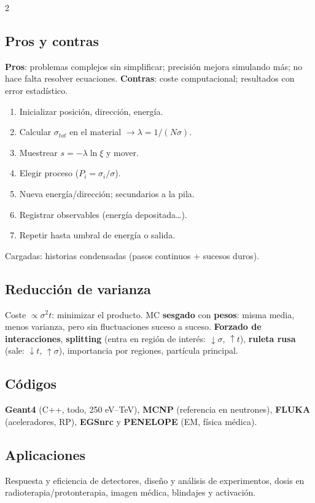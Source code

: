 \documentclass[10pt,a4paper]{article}
\begin{document}
\begin{multicols}{2}
\subsection{Pros y contras}
\textbf{Pros}: problemas complejos sin simplificar; precisión mejora simulando más; no hace falta resolver ecuaciones.
\textbf{Contras}: coste computacional; resultados con error estadístico.
\columnbreak
\begin{clave}
\begin{enumerate}
\item Inicializar posición, dirección, energía.
\item Calcular $\sigma_{tot}$ en el material $\to\lambda=1/(N\sigma)$.
\item Muestrear $s=-\lambda\ln\xi$ y mover.
\item Elegir proceso ($P_i=\sigma_i/\sigma$).
\item Nueva energía/dirección; secundarios a la pila.
\item Registrar observables (energía depositada\dots).
\item Repetir hasta umbral de energía o salida.
\end{enumerate}
\end{clave}
Cargadas: historias condensadas (pasos continuos + sucesos duros).
\subsection{Reducción de varianza}
Coste $\propto\sigma^2t$: minimizar el producto. MC \textbf{sesgado} con \textbf{pesos}: misma media, menos varianza, pero sin fluctuaciones suceso a suceso.
\textbf{Forzado de interacciones}, \textbf{splitting} (entra en región de interés: $\downarrow\sigma$, $\uparrow t$), \textbf{ruleta rusa} (sale: $\downarrow t$, $\uparrow\sigma$), importancia por regiones, partícula principal.
\subsection{Códigos}
\textbf{Geant4} (C++, todo, 250 eV--TeV), \textbf{MCNP} (referencia en neutrones), \textbf{FLUKA} (aceleradores, RP), \textbf{EGSnrc} y \textbf{PENELOPE} (EM, física médica).
\subsection{Aplicaciones}
Respuesta y eficiencia de detectores, diseño y análisis de experimentos, dosis en radioterapia/protonterapia, imagen médica, blindajes y activación.
\end{multicols}
\newpage
\end{document}
